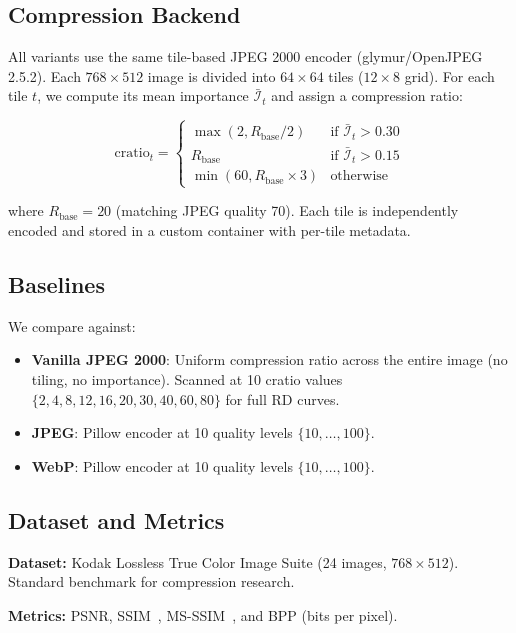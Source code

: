 \documentclass[conference]{IEEEtran}
\begin{document}
\subsection{Compression Backend}

All variants use the same tile-based JPEG 2000 encoder (glymur/OpenJPEG 2.5.2).
Each $768\times512$ image is divided into $64\times64$ tiles ($12\times8$ grid).
For each tile $t$, we compute its mean importance $\bar{\mathcal{I}}_t$ and
assign a compression ratio:

\begin{equation}
\text{cratio}_t = \begin{cases}
\max(2, R_{\text{base}} / 2) & \text{if } \bar{\mathcal{I}}_t > 0.30 \\
R_{\text{base}} & \text{if } \bar{\mathcal{I}}_t > 0.15 \\
\min(60, R_{\text{base}} \times 3) & \text{otherwise}
\end{cases}
\end{equation}

where $R_{\text{base}} = 20$ (matching JPEG quality 70). Each tile is
independently encoded and stored in a custom container with per-tile metadata.

\subsection{Baselines}

We compare against:
\begin{itemize}
    \item \textbf{Vanilla JPEG 2000}: Uniform compression ratio across the
      entire image (no tiling, no importance). Scanned at 10 cratio values
      $\{2,4,8,12,16,20,30,40,60,80\}$ for full RD curves.
    \item \textbf{JPEG}: Pillow encoder at 10 quality levels $\{10,\dots,100\}$.
    \item \textbf{WebP}: Pillow encoder at 10 quality levels $\{10,\dots,100\}$.
\end{itemize}

\subsection{Dataset and Metrics}

\textbf{Dataset:} Kodak Lossless True Color Image Suite (24 images,
$768\times512$). Standard benchmark for compression research.

\textbf{Metrics:} PSNR, SSIM~\cite{wang2004image}, MS-SSIM~\cite{wang2003multiscale},
and BPP (bits per pixel).
\end{document}
